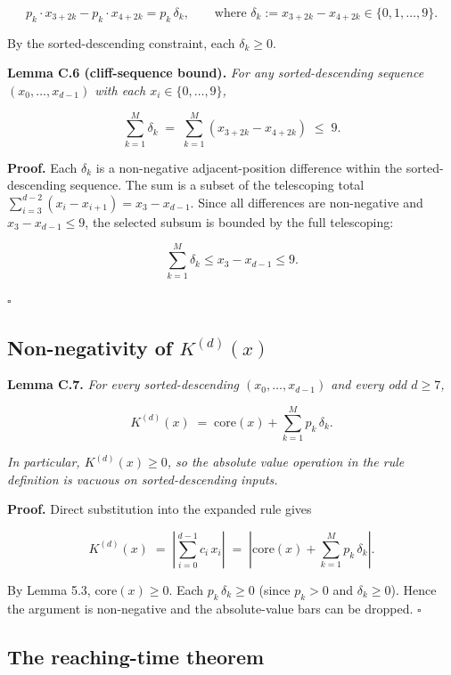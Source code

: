 \documentclass[11pt,letterpaper]{article}
\theoremstyle{paperstyle}
\theoremstyle{paperstyledef}
\theoremstyle{paperstylerem}
\begin{document}
\[p_k \cdot x_{3 + 2k} - p_k \cdot x_{4 + 2k} = p_k \, \delta_k, \qquad \text{where } \delta_k := x_{3 + 2k} - x_{4 + 2k} \in \{0, 1, \ldots, 9\}.\]

By the sorted-descending constraint, each \(\delta_k \geq 0\).

\textbf{Lemma C.6 (cliff-sequence bound).} \emph{For any
sorted-descending sequence \((x_0, \ldots, x_{d-1})\) with each
\(x_i \in \{0, \ldots, 9\}\),}

\[\sum_{k = 1}^{M} \delta_k \;=\; \sum_{k = 1}^{M} (x_{3 + 2k} - x_{4 + 2k}) \;\leq\; 9.\]

\textbf{Proof.} Each \(\delta_k\) is a non-negative adjacent-position
difference within the sorted-descending sequence. The sum is a subset of
the telescoping total
\(\sum_{i=3}^{d-2} (x_i - x_{i+1}) = x_3 - x_{d-1}\). Since all
differences are non-negative and \(x_3 - x_{d-1} \leq 9\), the selected
subsum is bounded by the full telescoping:

\[\sum_{k = 1}^{M} \delta_k \leq x_3 - x_{d-1} \leq 9.\]

\(\square\)

\hypertarget{c.4.2-non-negativity-of-kdx}{%
\subsection{\texorpdfstring{Non-negativity of \(K^{(d)}(x)\)}{Non-negativity of K\^{}\{(d)\}(x)}}\label{c.4.2-non-negativity-of-kdx}}

\textbf{Lemma C.7.} \emph{For every sorted-descending
\((x_0, \ldots, x_{d-1})\) and every odd \(d \geq 7\),}

\[K^{(d)}(x) \;=\; \mathrm{core}(x) + \sum_{k=1}^{M} p_k \, \delta_k.\]

\emph{In particular, \(K^{(d)}(x) \geq 0\), so the absolute value
operation in the rule definition is vacuous on sorted-descending
inputs.}

\textbf{Proof.} Direct substitution into the expanded rule gives

\[K^{(d)}(x) \;=\; \left| \sum_{i = 0}^{d-1} c_i \, x_i \right| \;=\; \left| \mathrm{core}(x) + \sum_{k=1}^{M} p_k \, \delta_k \right|.\]

By Lemma 5.3, \(\mathrm{core}(x) \geq 0\). Each
\(p_k \, \delta_k \geq 0\) (since \(p_k > 0\) and \(\delta_k \geq 0\)).
Hence the argument is non-negative and the absolute-value bars can be
dropped. \(\square\)

\hypertarget{c.4.3-the-reaching-time-theorem}{%
\subsection{The reaching-time theorem}\label{c.4.3-the-reaching-time-theorem}}
\end{document}
